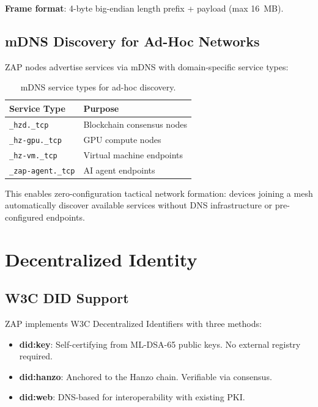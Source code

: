 \documentclass[11pt,letterpaper]{article}
\begin{document}
\textbf{Frame format}: 4-byte big-endian length prefix + payload (max 16~MB).

\subsection{mDNS Discovery for Ad-Hoc Networks}

ZAP nodes advertise services via mDNS with domain-specific service types:

\begin{table}[H]
\centering
\begin{tabular}{@{}ll@{}}
\toprule
\textbf{Service Type} & \textbf{Purpose} \\
\midrule
\texttt{\_hzd.\_tcp} & Blockchain consensus nodes \\
\texttt{\_hz-gpu.\_tcp} & GPU compute nodes \\
\texttt{\_hz-vm.\_tcp} & Virtual machine endpoints \\
\texttt{\_zap-agent.\_tcp} & AI agent endpoints \\
\bottomrule
\end{tabular}
\caption{mDNS service types for ad-hoc discovery.}
\label{tab:mdns}
\end{table}

This enables zero-configuration tactical network formation: devices joining a mesh automatically discover available services without DNS infrastructure or pre-configured endpoints.

\section{Decentralized Identity}

\subsection{W3C DID Support}

ZAP implements W3C Decentralized Identifiers with three methods:

\begin{itemize}
\item \textbf{did:key}: Self-certifying from ML-DSA-65 public keys. No external registry required.
\item \textbf{did:hanzo}: Anchored to the Hanzo chain. Verifiable via consensus.
\item \textbf{did:web}: DNS-based for interoperability with existing PKI.
\end{itemize}
\end{document}
